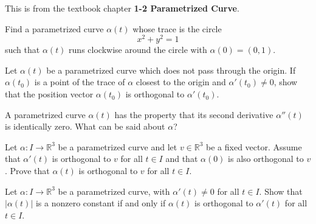 \documentclass[12pt,letterpaper]{hmcpset}
\begin{document}
This is from the textbook chapter \textbf{1-2 Parametrized Curve}.

\begin{problem}[1]
	Find a parametrized curve $\alpha(t)$ whose trace is the circle
	\[
		x^2 + y^2 = 1
	\]
	such that $\alpha(t)$ runs clockwise around the circle with
	$\alpha(0) = (0,1)$.
\end{problem}

\begin{solution}
	\vfill
\end{solution}

\newpage


\begin{problem}[2]
	Let $\alpha(t)$ be a parametrized curve which does not pass through the
	origin. If $\alpha(t_0)$ is a point of the trace of $\alpha$ closest to
	the origin and $\alpha'(t_0) \neq 0$, show that the position vector
	$\alpha(t_0)$ is orthogonal to $\alpha'(t_0)$.
\end{problem}

\begin{solution}
	\vfill
\end{solution}

\newpage


\begin{problem}[3]
	A parametrized curve $\alpha(t)$ has the property that its second
	derivative $\alpha''(t)$ is identically zero. What can be said about
	$\alpha$?
\end{problem}

\begin{solution}
	\vfill
\end{solution}

\newpage


\begin{problem}[4]
	Let $\alpha \colon I \to \mathbb{R}^3$ be a parametrized curve and let
	$v \in \mathbb{R}^3$ be a fixed vector. Assume that $\alpha'(t)$ is
	orthogonal to $v$ for all $t \in I$ and that $\alpha(0)$ is also
	orthogonal to $v$. Prove that $\alpha(t)$ is orthogonal to $v$ for all
	$t \in I$.
\end{problem}

\begin{solution}
	\vfill
\end{solution}

\newpage


\begin{problem}[5]
	Let $\alpha \colon I \to \mathbb{R}^3$ be a parametrized curve, with
	$\alpha'(t) \neq 0$ for all $t \in I$. Show that $|\alpha(t)|$ is a
	nonzero constant if and only if $\alpha(t)$ is orthogonal to
	$\alpha'(t)$ for all $t \in I$.
\end{problem}

\begin{solution}
	\vfill
\end{solution}

\newpage
\end{document}
